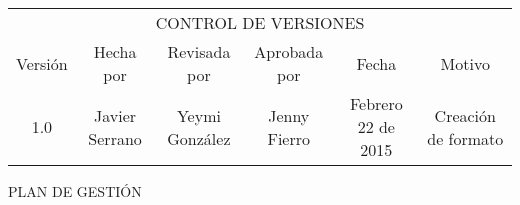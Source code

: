%
\begin{table}[H]
	\centering
	\begin{tabular}{| c | c | c | c | c | c | }
	\hline
	\multicolumn{6}{c}{CONTROL DE VERSIONES} \\
	\cline{1-6}\noalign{\smallskip}
	\hline
	Versi\'on & Hecha por & Revisada por & Aprobada por & Fecha & Motivo \\ \hline
	 1.0 & Javier Serrano & Yeymi Gonz\'alez & Jenny Fierro & Febrero 22 de 2015 & Creaci\'on de formato \\
	\hline
	\end{tabular}
\end{table}
%
\begin{center}
	\huge{PLAN DE GESTI\'ON}
\end{center}